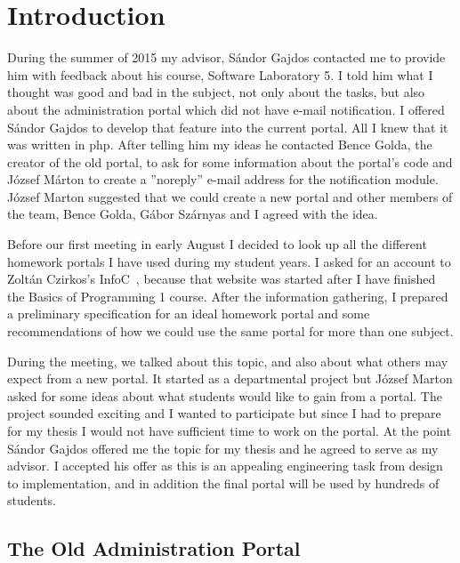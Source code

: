 \chapter{Introduction}

During the summer of 2015 my advisor, Sándor Gajdos contacted me to provide him with feedback about his course, Software Laboratory 5. I told him what I thought was good and bad in the subject, not only about the tasks, but also about the administration portal which did not have e-mail notification. I offered Sándor Gajdos to develop that feature into the current portal. All I knew that it was written in php. After telling him my ideas he contacted Bence Golda, the creator of the old portal, to ask for some information about the portal's code and József Márton to create a ''noreply'' e-mail address for the notification module. József Marton suggested that we could create a new portal and other members of the team, Bence Golda, Gábor Szárnyas and I agreed with the idea. 

Before our first meeting in early August I decided to look up all the different homework portals I have used during my student years. I asked for an account to Zoltán Czirkos's InfoC~\cite{InfoC}, because that website was started after I have finished the Basics of Programming 1 course. After the information gathering, I prepared a preliminary specification for an ideal homework portal and some recommendations of how we could use the same portal for more than one subject.

During the meeting, we talked about this topic, and also about what others may expect from a new portal. It started as a departmental project but József Marton asked for some ideas about what students would like to gain from a portal. The project sounded exciting and I wanted to participate but since I had to prepare for my thesis I would not have sufficient time to work on the portal. At the point Sándor Gajdos offered me the topic for my thesis and he agreed to serve as my advisor. I accepted his offer as this is an appealing engineering task from design to implementation, and in addition the final portal will be used by hundreds of students.


\section{The Old Administration Portal} 


